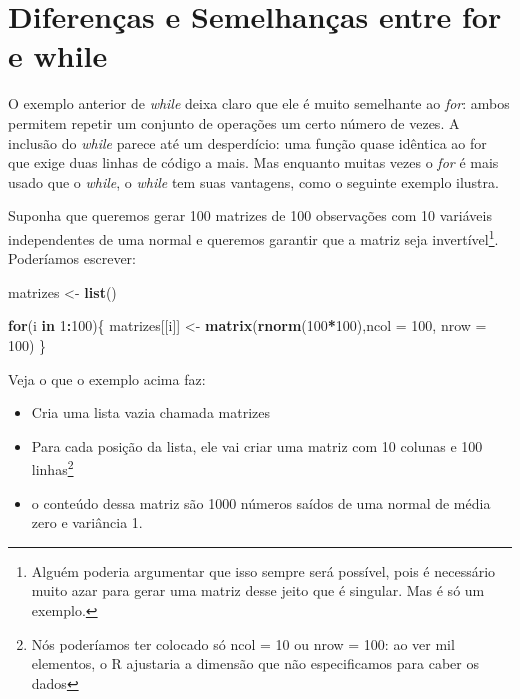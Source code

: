 \documentclass[
]{book}
\newenvironment{Shaded}{\begin{snugshade}}{\end{snugshade}}
\newcommand{\ControlFlowTok}[1]{\textcolor[rgb]{0.13,0.29,0.53}{\textbf{#1}}}
\newcommand{\DataTypeTok}[1]{\textcolor[rgb]{0.13,0.29,0.53}{#1}}
\newcommand{\DecValTok}[1]{\textcolor[rgb]{0.00,0.00,0.81}{#1}}
\newcommand{\KeywordTok}[1]{\textcolor[rgb]{0.13,0.29,0.53}{\textbf{#1}}}
\newcommand{\NormalTok}[1]{#1}
\newcommand{\OperatorTok}[1]{\textcolor[rgb]{0.81,0.36,0.00}{\textbf{#1}}}
\newcommand{\StringTok}[1]{\textcolor[rgb]{0.31,0.60,0.02}{#1}}
\providecommand{\tightlist}{%
  \setlength{\itemsep}{0pt}\setlength{\parskip}{0pt}}
\begin{document}
\hypertarget{diferenuxe7as-e-semelhanuxe7as-entre-for-e-while}{%
\section{Diferenças e Semelhanças entre for e while}\label{diferenuxe7as-e-semelhanuxe7as-entre-for-e-while}}

O exemplo anterior de \emph{while} deixa claro que ele é muito semelhante ao \emph{for}: ambos permitem repetir um conjunto de operações um certo número de vezes. A inclusão do \emph{while} parece até um desperdício: uma função quase idêntica ao for que exige duas linhas de código a mais. Mas enquanto muitas vezes o \emph{for} é mais usado que o \emph{while}, o \emph{while} tem suas vantagens, como o seguinte exemplo ilustra.

Suponha que queremos gerar 100 matrizes de 100 observações com 10 variáveis independentes de uma normal e queremos garantir que a matriz seja invertível\footnote{Alguém poderia argumentar que isso sempre será possível, pois é necessário muito azar para gerar uma matriz desse jeito que é singular. Mas é só um exemplo.}. Poderíamos escrever:

\begin{Shaded}
\begin{Highlighting}[]
\NormalTok{matrizes \textless{}{-}}\StringTok{ }\KeywordTok{list}\NormalTok{()}

\ControlFlowTok{for}\NormalTok{(i }\ControlFlowTok{in} \DecValTok{1}\OperatorTok{:}\DecValTok{100}\NormalTok{)\{}
\NormalTok{matrizes[[i]] \textless{}{-}}\StringTok{ }\KeywordTok{matrix}\NormalTok{(}\KeywordTok{rnorm}\NormalTok{(}\DecValTok{100}\OperatorTok{*}\DecValTok{100}\NormalTok{),}\DataTypeTok{ncol =} \DecValTok{100}\NormalTok{, }\DataTypeTok{nrow =} \DecValTok{100}\NormalTok{)}
\NormalTok{\}}
\end{Highlighting}
\end{Shaded}

Veja o que o exemplo acima faz:

\begin{itemize}
\tightlist
\item
  Cria uma lista vazia chamada matrizes
\item
  Para cada posição da lista, ele vai criar uma matriz com 10 colunas e 100 linhas\footnote{Nós poderíamos ter colocado só ncol = 10 ou nrow = 100: ao ver mil elementos, o R ajustaria a dimensão que não especificamos para caber os dados}
\item
  o conteúdo dessa matriz são 1000 números saídos de uma normal de média zero e variância 1.
\end{itemize}
\end{document}
